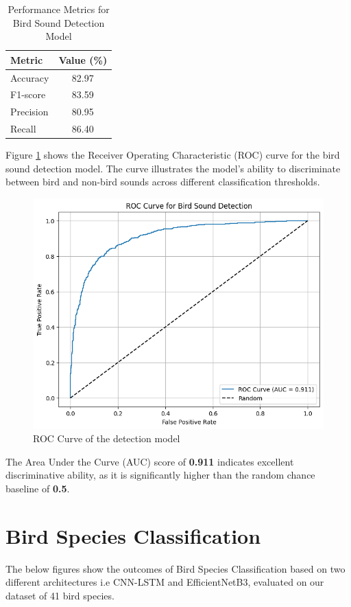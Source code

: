 \begin{table}[h]
      \centering
      \caption{Performance Metrics for Bird Sound Detection Model}
      \label{tab:detection_metrics}
      \begin{tabular}{|l|c|}
            \hline
            \textbf{Metric} & \textbf{Value (\%)} \\
            \hline
            Accuracy & 82.97 \\
            F1-score & 83.59 \\
            Precision & 80.95 \\
            Recall & 86.40 \\
            \hline
      \end{tabular}
\end{table}

Figure \ref{fig:ROC Curve} shows the Receiver Operating Characteristic (ROC) curve for the bird sound detection model. The curve illustrates the model's ability to discriminate between bird and non-bird sounds across different classification thresholds.
\begin{figure}[h!]
    \centering
    \includegraphics[scale=0.65]{images/detection_auc.png}
    \caption{ROC Curve of the detection model}
    \label{fig:ROC Curve}
\end{figure}

The Area Under the Curve (AUC) score of \textbf{0.911} indicates excellent discriminative ability, as it is significantly higher than the random chance baseline of \textbf{0.5}.
\section{Bird Species Classification}
The below figures show the outcomes of Bird Species Classification based on two different architectures i.e CNN-LSTM and EfficientNetB3, evaluated on our dataset of 41 bird species.

